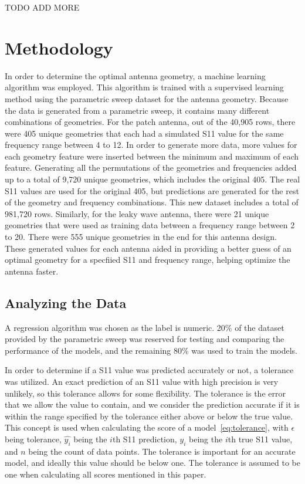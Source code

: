 \documentclass[lettersize,journal]{IEEEtran}
\begin{document}
TODO ADD MORE 


\section{Methodology}
In order to determine the optimal antenna geometry, a machine learning algorithm was employed. This algorithm is trained with a supervised learning method using the parametric sweep dataset for the antenna geometry. Because the data is generated from a parametric sweep, it contains many different combinations of geometries. For the patch antenna, out of the 40,905 rows, there were 405 unique geometries that each had a simulated S11 value for the same frequency range between 4 to 12. In order to generate more data, more values for each geometry feature were inserted between the minimum and maximum of each feature. Generating all the permutations of the geometries and frequencies added up to a total of 9,720 unique geometries, which includes the original 405. The real S11 values are used for the original 405, but predictions are generated for the rest of the geometry and frequency combinations. This new dataset includes a total of 981,720 rows. Similarly, for the leaky wave antenna, there were 21 unique geometries that were used as training data between a frequency range between 2 to 20. There were 555 unique geometries in the end for this antenna design. These generated values for each antenna aided in providing a better guess of an optimal geometry for a specfiied S11 and frequency range, helping optimize the antenna faster. 

\subsection{Analyzing the Data}
A regression algorithm was chosen as the label is numeric. 20\% of the dataset provided by the parametric sweep was reserved for testing and comparing the performance of the models, and the remaining 80\% was used to train the models.

In order to determine if a S11 value was predicted accurately or not, a tolerance was utilized. An exact prediction of an S11 value with high precision is very unlikely, so this tolerance allows for some flexibility. The tolerance is the error that we allow the value to contain, and we consider the prediction accurate if it is within the range specified by the tolerance either above or below the true value. This concept is used when calculating the score of a model~\eqref{eq:tolerance}, with $\epsilon$ being tolerance, $\hat{y_i}$ being the $i$th S11 prediction, $y_i$ being the $i$th true S11 value, and $n$ being the count of data points. The tolerance is important for an accurate model, and ideally this value should be below one. The tolerance is assumed to be one when calculating all scores mentioned in this paper.
\end{document}
